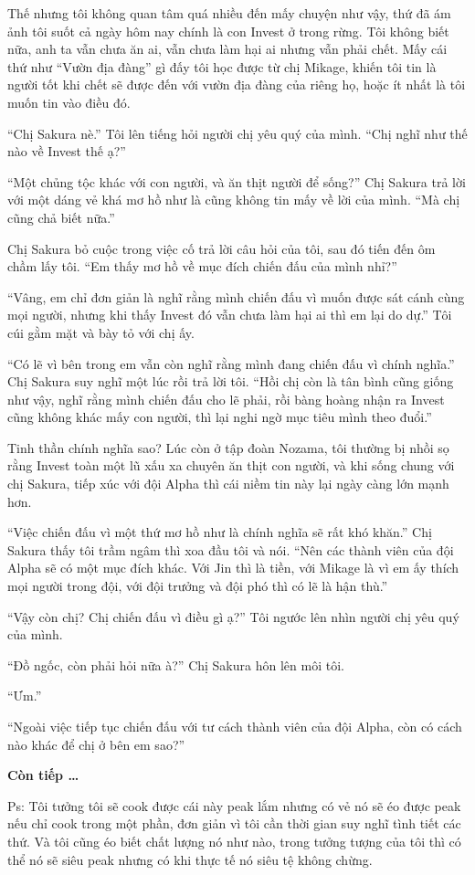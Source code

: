 {Thế nhưng tôi không quan tâm quá nhiều đến mấy chuyện như vậy, thứ đã ám
ảnh tôi suốt cả ngày hôm nay chính là con Invest ở trong rừng. Tôi không
biết nữa, anh ta vẫn chưa ăn ai, vẫn chưa làm hại ai nhưng vẫn phải
chết. Mấy cái thứ như ``Vườn địa đàng'' gì đấy tôi học được từ chị
Mikage, khiến tôi tin là người tốt khi chết sẽ được đến với vườn địa
đàng của riêng họ, hoặc ít nhất là tôi muốn tin vào điều đó.

``Chị Sakura nè.'' Tôi lên tiếng hỏi người chị yêu quý của mình. ``Chị
nghĩ như thế nào về Invest thế ạ?''

``Một chủng tộc khác với con người, và ăn thịt người để sống?'' Chị
Sakura trả lời với một dáng vẻ khá mơ hồ như là cũng không tin mấy về
lời của mình. ``Mà chị cũng chả biết nữa.''

Chị Sakura bỏ cuộc trong việc cố trả lời câu hỏi của tôi, sau đó tiến
đến ôm chầm lấy tôi. ``Em thấy mơ hồ về mục đích chiến đấu của mình
nhỉ?''

``Vâng, em chỉ đơn giản là nghĩ rằng mình chiến đấu vì muốn được sát
cánh cùng mọi người, nhưng khi thấy Invest đó vẫn chưa làm hại ai thì em
lại do dự.'' Tôi cúi gằm mặt và bày tỏ với chị ấy.

``Có lẽ vì bên trong em vẫn còn nghĩ rằng mình đang chiến đấu vì chính
nghĩa.'' Chị Sakura suy nghĩ một lúc rồi trả lời tôi. ``Hồi chị còn là
tân bình cũng giống như vậy, nghĩ rằng mình chiến đấu cho lẽ phải, rồi
bàng hoàng nhận ra Invest cũng không khác mấy con người, thì lại nghi
ngờ mục tiêu mình theo đuổi.''

Tinh thần chính nghĩa sao? Lúc còn ở tập đoàn Nozama, tôi thường bị nhồi
sọ rằng Invest toàn một lũ xấu xa chuyên ăn thịt con người, và khi sống
chung với chị Sakura, tiếp xúc với đội Alpha thì cái niềm tin này lại
ngày càng lớn mạnh hơn.

``Việc chiến đấu vì một thứ mơ hồ như là chính nghĩa sẽ rất khó khăn.''
Chị Sakura thấy tôi trầm ngâm thì xoa đầu tôi và nói. ``Nên các thành
viên của đội Alpha sẽ có một mục đích khác. Với Jin thì là tiền, với
Mikage là vì em ấy thích mọi người trong đội, với đội trưởng và đội phó
thì có lẽ là hận thù.''

``Vậy còn chị? Chị chiến đấu vì điều gì ạ?'' Tôi ngước lên nhìn người
chị yêu quý của mình.

``Đồ ngốc, còn phải hỏi nữa à?'' Chị Sakura hôn lên môi tôi.

``Ưm.''

``Ngoài việc tiếp tục chiến đấu với tư cách thành viên của đội Alpha,
còn có cách nào khác để chị ở bên em sao?''

\textbf{
    Còn tiếp \ldots{}
}

Ps: Tôi tưởng tôi sẽ cook được cái này peak lắm nhưng có vẻ nó sẽ éo
được peak nếu chỉ cook trong một phần, đơn giản vì tôi cần thời gian suy
nghĩ tình tiết các thứ. Và tôi cũng éo biết chất lượng nó như nào, trong
tưởng tượng của tôi thì có thể nó sẽ siêu peak nhưng có khi thực tế nó
siêu tệ không chừng.

}